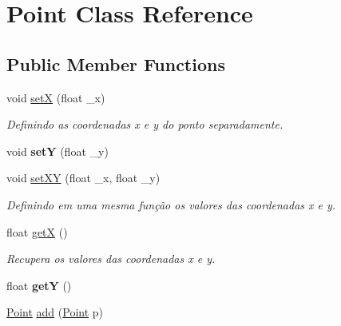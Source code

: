 \hypertarget{class_point}{}\section{Point Class Reference}
\label{class_point}
\subsection*{Public Member Functions}
\begin{DoxyCompactItemize}
\item 
\mbox{\label{class_point_a428a1676e2fdec6753c42011a1d59d18}} 
void \mbox{\hyperlink{class_point_a428a1676e2fdec6753c42011a1d59d18}{setX}} (float \+\_\+x)
\begin{DoxyCompactList}\small\item\em Definindo as coordenadas x e y do ponto separadamente. \end{DoxyCompactList}\item 
\mbox{\label{class_point_a9868c4601b0ea0c2d0de20fe41ee0e49}} 
void {\bfseries setY} (float \+\_\+y)
\item 
\mbox{\label{class_point_ab5385c6d9bfa841e641e4709fc9f14cc}} 
void \mbox{\hyperlink{class_point_ab5385c6d9bfa841e641e4709fc9f14cc}{set\+XY}} (float \+\_\+x, float \+\_\+y)
\begin{DoxyCompactList}\small\item\em Definindo em uma mesma função os valores das coordenadas x e y. \end{DoxyCompactList}\item 
\mbox{\label{class_point_acc27466778cc87a662bba40268c4c0c8}} 
float \mbox{\hyperlink{class_point_acc27466778cc87a662bba40268c4c0c8}{getX}} ()
\begin{DoxyCompactList}\small\item\em Recupera os valores das coordenadas x e y. \end{DoxyCompactList}\item 
\mbox{\label{class_point_a3cccbca94719ddde353cce86ce0e2f64}} 
float {\bfseries getY} ()
\item 
\mbox{\hyperlink{class_point}{Point}} \mbox{\hyperlink{class_point_a8a2ee9e0febd224f86391229e77c2aee}{add}} (\mbox{\hyperlink{class_point}{Point}} p)

\end{DoxyCompactItemize}
